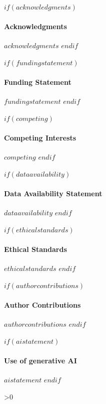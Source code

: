 $if(acknowledgments)$
\paragraph{Acknowledgments}
$acknowledgments$
$endif$

$if(fundingstatement)$
\paragraph{Funding Statement}
$fundingstatement$
$endif$

$if(competing)$
\paragraph{Competing Interests}
$competing$
$endif$

$if(dataavailability)$
\paragraph{Data Availability Statement}
$dataavailability$
$endif$

$if(ethicalstandards)$
\paragraph{Ethical Standards}
$ethicalstandards$
$endif$

$if(authorcontributions)$
\paragraph{Author Contributions}
$authorcontributions$
$endif$

$if(aistatement)$
\paragraph{Use of generative AI}
$aistatement$
$endif$

\ifnum\value{endnote}>0 \printendnotes\fi
